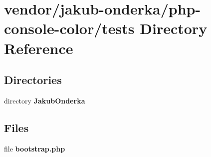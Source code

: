 \section{vendor/jakub-\/onderka/php-\/console-\/color/tests Directory Reference}
\label{dir_121b51a09a1a9a3526f4d060b31bab91}
\subsection*{Directories}
\begin{DoxyCompactItemize}
\item 
directory {\bf Jakub\+Onderka}
\end{DoxyCompactItemize}
\subsection*{Files}
\begin{DoxyCompactItemize}
\item 
file {\bf bootstrap.\+php}
\end{DoxyCompactItemize}
